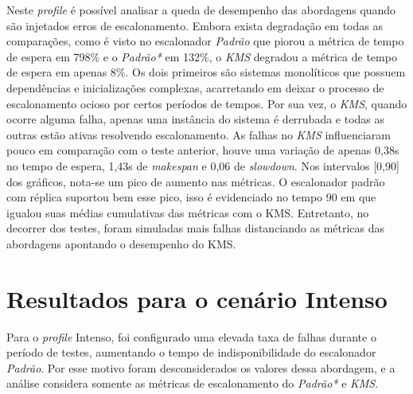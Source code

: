 Neste \textit{profile} é possível analisar a queda de desempenho das abordagens quando são injetados erros de escalonamento. Embora exista degradação em todas as comparações, como é visto no escalonador \textit{Padrão} que piorou a métrica de tempo de espera em 798\% e o \textit{Padrão*} em 132\%, o \textit{KMS} degradou a métrica de tempo de espera em apenas 8\%. Os dois primeiros são sistemas monolíticos que possuem dependências e inicializações complexas, acarretando em deixar o processo de escalonamento ocioso por certos períodos de tempos. Por sua vez, o \textit{KMS}, quando ocorre alguma falha, apenas uma instância do sistema é derrubada e todas as outras estão ativas resolvendo escalonamento. As falhas no \textit{KMS} influenciaram pouco em comparação com o teste anterior, houve uma variação de apenas 0,38s no tempo de espera, 1,43s de \textit{makespan} e 0,06 de \textit{slowdown}. Nos intervalos [0,90] dos gráficos, nota-se um pico de aumento nas métricas. O escalonador padrão com réplica suportou bem esse pico, isso é evidenciado no tempo 90 em que igualou suas médias cumulativas das métricas com o \ac{KMS}. Entretanto, no decorrer dos testes, foram simuladas mais falhas distanciando as métricas das abordagens apontando o desempenho do \ac{KMS}.

\newpage
\section{Resultados para o cenário Intenso}
Para o \textit{profile} Intenso,  foi configurado uma elevada taxa de falhas durante o período de testes, aumentando o tempo de indisponibilidade do escalonador \textit{Padrão}. Por esse motivo foram desconsiderados os valores dessa abordagem, e a análise considera somente as métricas de escalonamento do \textit{Padrão*} e \textit{KMS}.

